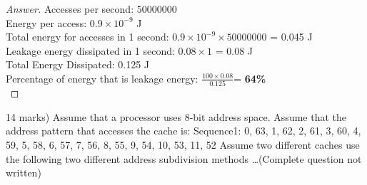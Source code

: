 \documentclass[12pt]{article}
\newenvironment{exercise}[2][Exercise]{\begin{trivlist}
\item[\hskip \labelsep {\bfseries #1}\hskip \labelsep {\bfseries #2.}]}{\end{trivlist}}
\begin{document}
\begin{proof}[Answer]
Accesses per second: 50000000 \\
Energy per access: $0.9 \times 10^{-9}$ J \\
Total energy for accesses in 1 second: $0.9 \times 10^{-9} \times 50000000$ = 0.045 J \\
Leakage energy dissipated in 1 second: $0.08 \times 1$ = 0.08 J \\
Total Energy Dissipated: 0.125 J \\
Percentage of energy that is leakage energy: $\frac{100\times 0.08}{0.125}$= \textbf{64\%} \\
\end{proof}

\begin{exercise}[Question]{3}
	(14 marks) Assume that a processor uses 8-bit address space. Assume that the
address pattern that accesses the cache is:
Sequence1: 0, 63, 1, 62, 2, 61, 3, 60, 4, 59, 5, 58, 6, 57, 7, 56, 8, 55, 9, 54, 10, 53,
11, 52
Assume two different caches use the following two different address subdivision
methods \ldots (Complete question not written) 
\end{exercise}
 
\end{document}
